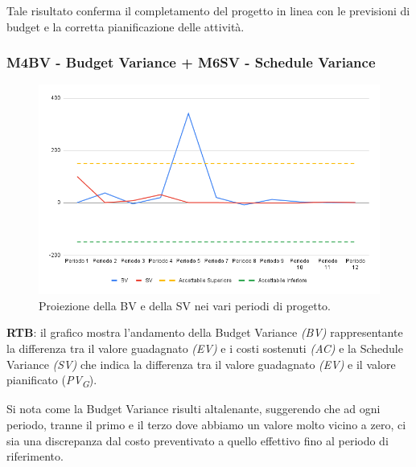 \vspace{0.2cm}
Tale risultato conferma il completamento del progetto in linea con le previsioni di budget e la corretta pianificazione delle attività.

\subsubsection{M4BV - Budget Variance + M6SV - Schedule Variance}

\vspace{0.3cm}

\begin{figure}[H]
    \centering
    \includegraphics[width=1\textwidth]{../Images/PianoDiQualifica/BV_SV.png}
    \caption{Proiezione della BV e della SV nei vari periodi di progetto.}
    \label{fig:5}
\end{figure}

\vspace{0.2cm}

\textbf{RTB}: il grafico mostra l'andamento della Budget Variance \textit{(BV)} rappresentante la differenza tra il valore guadagnato \textit{(EV)} e i costi sostenuti \textit{(AC)} e la Schedule Variance \textit{(SV)} che indica la differenza tra il valore guadagnato \textit{(EV)} e il valore pianificato (\textit{PV}\textsubscript{\textit{G}}).

\vspace{0.2cm}

Si nota come la Budget Variance risulti altalenante, suggerendo che ad ogni periodo, tranne il primo e il terzo dove abbiamo un valore molto vicino a zero, ci sia una discrepanza dal costo preventivato a quello effettivo fino al periodo di riferimento. 

\vspace{0.2cm}

